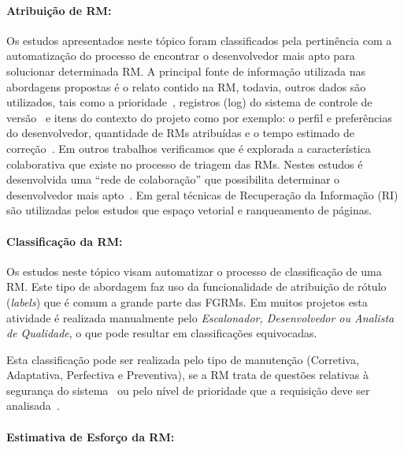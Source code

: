 \paragraph{Atribuição de RM:}

Os estudos apresentados neste tópico foram classificados pela pertinência com a
automatização do processo de encontrar o desenvolvedor mais apto para solucionar
determinada RM\@. A principal fonte de informação utilizada nas abordagens
propostas é o relato contido na RM, todavia, outros dados são utilizados, tais
como a prioridade~\cite{tian2015automated}, registros (log) do sistema de
controle de versão~\cite{shokripour2012automatic, Hu:2014:EBT:2707683.2708297} e
itens do contexto do projeto como por exemplo: o perfil e preferências do
desenvolvedor, quantidade de RMs atribuídas e o tempo estimado de
correção~\cite{hosseini2012market}. Em outros trabalhos verificamos que é
explorada a característica colaborativa que existe no processo de triagem das
RMs. Nestes estudos é desenvolvida uma ``rede de colaboração'' que possibilita
determinar o desenvolvedor mais apto~\cite{Zhang2014,Zanetti2013, Wu2011}.  Em
geral técnicas de Recuperação da Informação (RI) são utilizadas pelos estudos
que espaço vetorial e ranqueamento de páginas.

\paragraph{Classificação da RM:}

Os estudos neste tópico visam automatizar o processo de clas\-si\-fi\-ca\-ção
de uma RM\@. Este tipo de abordagem faz uso da funcionalidade de atribuição de
rótulo (\textit{labels}) que é comum  a grande parte das FGRMs. Em muitos
projetos esta atividade é realizada manualmente pelo \textit{Escalonador,
    Desenvolvedor ou Analista de Qualidade}, o que pode resultar em
classificações equivocadas.

Esta classificação pode ser realizada pelo tipo de manutenção (Corretiva,
Adaptativa, Perfectiva e Preventiva), se a RM trata de questões relativas à
segurança do sistema~\cite{gegick2010identifying, behl2014bug} ou pelo nível de
prioridade que a requisição deve ser analisada~\cite{behl2014bug}.

\paragraph{Estimativa de Esforço da RM:}

